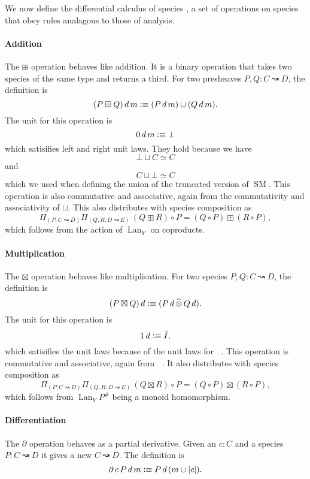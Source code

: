 \documentclass[12pt, parskip, DIV=14]{scrbook}
\newcommand{\defeq}{\vcentcolon\equiv}
\renewcommand{\circ}{\vysmwhtcircle}
\newcommand{\SM}{\operatorname{SM}}
\DeclareMathOperator\daytensor{\widehat\otimes}
\newcommand{\Lan}{\operatorname{Lan}}
\newcommand{\spec}[2]{#1 \rightwavearrow #2}
\begin{document}
We now define the differential calculus of species \citep{fiore2005mathematical}, a set of operations on species that obey rules analagous to those of analysis.

\paragraph{Addition} The $\boxplus$ operation behaves like addition. It is a binary operation that takes two species of the same type and returns a third. For two presheaves $P , Q : \spec{C}{D}$, the definition is
$$(P \boxplus Q)\,d\,m \defeq (P\,d\,m) \sqcup (Q\,d\,m).$$
The unit for this operation is
$$0\,d\,m \defeq \bot$$
which satisifies left and right unit laws. They hold because we have
$$\bot \sqcup C \simeq C$$
and
$$C \sqcup \bot \simeq C$$
which we used when defining the union of the truncated version of $\SM$. This operation is also commutative and associative, again from the commutativity and associativity of $\sqcup$. This also distributes with species composition as
$$\Pi_{(P : \spec{C}{D})}\Pi_{(Q , R : \spec{D}{E})}\,(Q \boxplus R) \circ P = (Q \circ P) \boxplus (R \circ P),$$
which follows from the action of $\Lan_Y$ on coproducts.

\paragraph{Multiplication} The $\boxtimes$ operation behaves like multiplication. For two species $P , Q : \spec{C}{D}$, the definition is
$$(P \boxtimes Q)\,d \defeq (P\,d \daytensor Q\,d).$$
The unit for this operation is
$$1\,d \defeq \hat{I},$$
which satisifies the unit laws because of the unit laws for $\daytensor$. This operation is commutative and associative, again from $\daytensor$. It also distributes with species composition as
$$\Pi_{(P : \spec{C}{D})}\Pi_{(Q , R : \spec{D}{E})}\,(Q \boxtimes R) \circ P = (Q \circ P) \boxtimes (R \circ P),$$ which follows from $\Lan_Y P^\#$ being a monoid homomorphism.


\paragraph{Differentiation} The $\partial$ operation behaves as a partial derivative. Given an $c : C$ and a species $P : \spec{C}{D}$ it gives a new $\spec{C}{D}$. The definition is
$$\partial\,c\,P\,d\,m \defeq P\,d\,(m \cup [c]).$$
\end{document}
